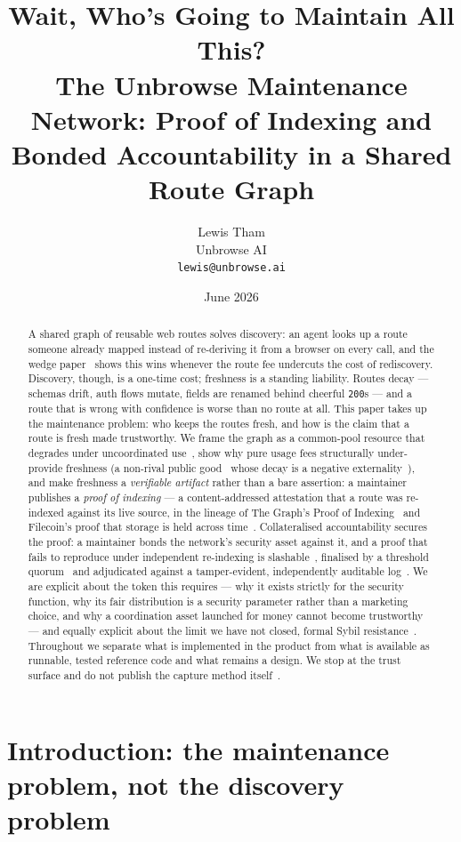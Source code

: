 \documentclass[11pt]{article}
\title{\textbf{Wait, Who's Going to Maintain All This?}\\
\large The Unbrowse Maintenance Network: Proof of Indexing and Bonded Accountability in a Shared Route Graph}
\author{Lewis Tham\\ Unbrowse AI \\ \texttt{lewis@unbrowse.ai}}
\date{June 2026}
\begin{document}
\maketitle

\begin{abstract}
A shared graph of reusable web routes solves discovery: an agent looks up a route
someone already mapped instead of re-deriving it from a browser on every call, and
the wedge paper~\cite{wedge} shows this wins whenever the route fee
undercuts the cost of rediscovery. Discovery, though, is a one-time cost; freshness
is a standing liability. Routes decay --- schemas drift, auth flows mutate, fields
are renamed behind cheerful \texttt{200}s --- and a route that is wrong with
confidence is worse than no route at all. This paper takes up the maintenance
problem: who keeps the routes fresh, and how is the claim that a route is fresh made
trustworthy. We frame the graph as a common-pool resource that degrades under
uncoordinated use~\cite{ostrom}, show why pure usage fees structurally under-provide
freshness (a non-rival public good~\cite{samuelson} whose decay is a negative
externality~\cite{pigou}), and make freshness a \emph{verifiable artifact} rather
than a bare assertion: a maintainer publishes a \emph{proof of indexing} --- a
content-addressed attestation that a route was re-indexed against its live source,
in the lineage of The Graph's Proof of Indexing~\cite{thegraph} and Filecoin's proof
that storage is held across time~\cite{filecoin2017}. Collateralised accountability
secures the proof: a maintainer bonds the network's security asset against it, and a
proof that fails to reproduce under independent re-indexing is slashable~\cite{casper},
finalised by a threshold quorum~\cite{frost} and adjudicated against a
tamper-evident, independently auditable log~\cite{rfc6962}. We are explicit about the token this
requires --- why it exists strictly for the security function, why its fair
distribution is a
security parameter rather than a marketing choice, and why a coordination asset
launched for money cannot become trustworthy --- and equally explicit about the
limit we have not closed, formal Sybil resistance~\cite{sybil}. Throughout we
separate what is implemented in the product from what is available as runnable,
tested reference code and what remains a design. We stop at the trust surface and
do not publish the capture method itself~\cite{ossnotice}.
\end{abstract}

\section{Introduction: the maintenance problem, not the discovery problem}
\end{document}
